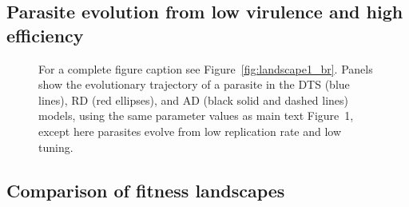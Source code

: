 \documentclass{article}
\newcommand{\figref}[1]{Figure~\ref{fig:#1}}
\begin{document}
\subsection*{Parasite evolution from low virulence and high efficiency}

\begin{figure}[H]
\caption{For a complete figure caption see \figref{landscape1_br}. Panels show the evolutionary trajectory of a parasite in the DTS (blue lines), RD (red ellipses), and AD (black solid and dashed lines) models, using the same parameter values as main text Figure~1, except here parasites evolve from low replication rate and low tuning.} 
\label{fig:landscape1_bl}
\end{figure} 


\subsection*{Comparison of fitness landscapes}
\end{document}
